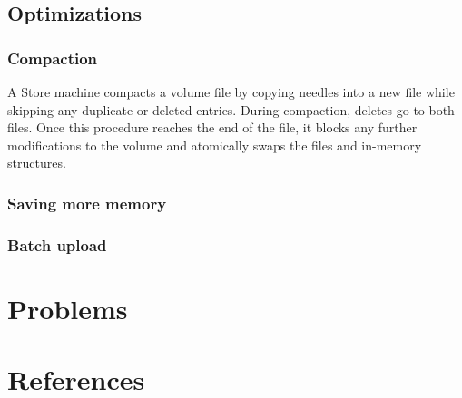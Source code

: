 \documentclass[11pt]{article}
\begin{document}
\subsection{Optimizations}
\label{sec:org3ddd884}
\subsubsection{Compaction}
\label{sec:orgf1fd9d8}
A Store machine compacts a volume file by copying needles into a new file while skipping any duplicate
or deleted entries. During compaction, deletes go to both files. Once this procedure reaches the end
of the file, it blocks any further modifications to the volume and atomically swaps the files and
in-memory structures.
\subsubsection{Saving more memory}
\label{sec:orgaadc2e9}
\subsubsection{Batch upload}
\label{sec:org4bd1862}
\section{Problems}
\label{sec:org79a2a06}


\section{References}
\label{sec:org5cab7be}
\label{bibliographystyle link}



\end{document}
